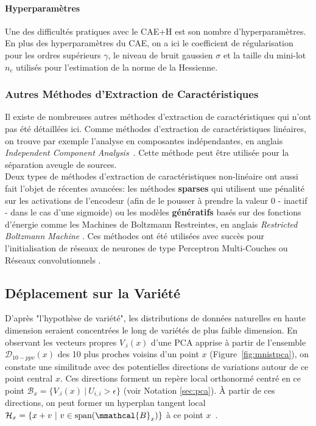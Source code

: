 \paragraph{Hyperparamètres} Une des difficultés pratiques avec le CAE+H est son nombre
d'hyperparamètres. En plus des hyperparamètres du CAE, on a ici le coefficient
de régularisation pour les ordres supérieurs $\gamma$, le niveau de bruit
gaussien $\sigma$ et la taille du mini-lot $n_c$ utilisés pour l'estimation de
la norme de la Hessienne.

\subsubsection{Autres Méthodes d'Extraction de Caractéristiques}

Il existe de nombreuses autres méthodes d'extraction de caractéristiques qui
n'ont pas été détaillées ici. Comme méthodes d'extraction de caractéristiques
linéaires, on trouve par exemple l'analyse en composantes indépendantes, en
anglais \textit{Independent Component Analysis}~\citep{Comon94,Hyvarinen-2001}.
Cette méthode peut être utilisée pour la séparation aveugle de sources.  \\

Deux types de méthodes d'extraction de caractéristiques non-linéaire  ont aussi
fait l'objet de récentes avancées: les méthodes {\bf sparses}
\citep{ranzato-08,koray-psd-08,Koray-08} qui utilisent une pénalité sur les
activations de l'encodeur (afin de le pousser à prendre la valeur $0$ - inactif
- dans le cas d'une sigmoide)  ou les modèles {\bf génératifs} basés sur des
  fonctions d'énergie \citep{ranzato-unsup-07} comme les Machines de Boltzmann
  Restreintes, en anglais \textit{Restricted Boltzmann Machine}
  \citep{Tieleman08}.  Ces méthodes ont été utilisées avec succès pour
  l'initialisation de réseaux de neurones de type Perceptron Multi-Couches
  \citep{HintonG2006,ranzato-08,koray-psd-08,Koray-08} ou Réseaux
  convolutionnels \citep{koray-nips-10-small}. 

\subsection{Déplacement sur la Variété}
\label{sec:surfing}

D'après "l'hypothèse de variété", les distributions de données naturelles en
haute dimension seraient concentrées le long de variétés de plus faible
dimension.  En observant les vecteurs propres $V_{.i}(x)$ d'une PCA apprise à
partir de l'ensemble $\mathcal{D}_{10-ppv}(x)$ des 10 plus proches voisins d'un
point $x$ (Figure~\ref{fig:mnistpca}), on constate une similitude avec des
potentielles directions de variations autour de ce point central $x$.  Ces
directions forment un repère local orthonormé centré en ce point
$\mathcal{B}_{x}=\lbrace V_{.i}(x)~|~U_{i,i} > \epsilon\rbrace$ (voir Notation
\ref{sec:pca}). À partir de ces directions, on peut former un hyperplan tangent
local $\mathcal{H}_{x}=\lbrace x + v~|~v\in\textrm{span}(\mmathcal{B}_{x}) \rbrace$ à ce point
$x$~\citep{Dauphin-et-al-NIPS2011}.


